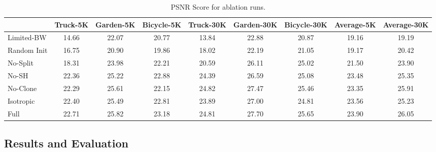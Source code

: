 \begin{table}[!h]
	\caption{PSNR Score for ablation runs. }
	\centering
	\begin{tabular}{l|ccc|ccc|cc}
		~ & Truck-5K & Garden-5K & Bicycle-5K & Truck-30K & Garden-30K & Bicycle-30K & Average-5K & Average-30K \\ \hline
		Limited-BW  & 14.66 & 22.07 & 20.77 & 13.84 & 22.88 & 20.87 & 19.16 & 19.19 \\
		Random Init & 16.75 & 20.90 & 19.86 & 18.02 & 22.19 & 21.05 & 19.17 & 20.42 \\ 
		No-Split    & 18.31 & 23.98 & 22.21 & 20.59 & 26.11 & 25.02 & 21.50 & 23.90 \\ 
		No-SH       & \cellcolor{yellow!40}22.36 & 25.22 & \cellcolor{orange!40}22.88 & \cellcolor{yellow!40}24.39 & 26.59 & \cellcolor{yellow!40}25.08 & \cellcolor{yellow!40}23.48 & \cellcolor{yellow!40}25.35 \\ 
		No-Clone    & 22.29 & \cellcolor{orange!40}25.61 & 22.15 & \cellcolor{red!40}24.82 & \cellcolor{orange!40}27.47 & \cellcolor{orange!40}25.46 & 23.35 & \cellcolor{orange!40}25.91 \\  
		Isotropic   & \cellcolor{orange!40}22.40 & \cellcolor{yellow!40}25.49 & \cellcolor{yellow!40}22.81 & 23.89 & \cellcolor{yellow!40}27.00 & 24.81 & \cellcolor{orange!40}23.56 & 25.23 \\  
		Full        & \cellcolor{red!40}22.71 & \cellcolor{red!40}25.82 & \cellcolor{red!40}23.18 & \cellcolor{orange!40}24.81 &\cellcolor{red!40} 27.70 & \cellcolor{red!40}25.65 & \cellcolor{red!40}23.90 & \cellcolor{red!40}26.05 \\  
		
	\end{tabular}
	\label{tab:ablation_table}
\end{table}




\subsection{Results and Evaluation}


